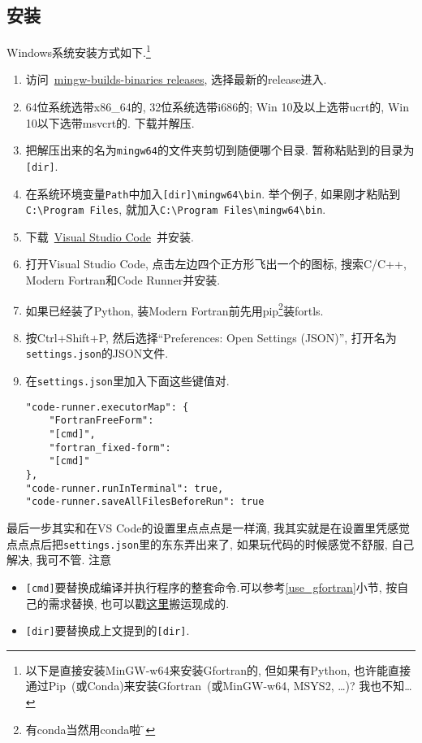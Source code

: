 \subsection{安装}

Windows系统安装方式如下.\footnote{
    以下是直接安装MinGW-w64来安装Gfortran的, 但如果有Python, 也许能直接通过Pip~(或Conda)来安装Gfortran~(或MinGW-w64, MSYS2, \dots)? 我也不知\dots
}
\begin{enumerate}
    \item 访问~\href{https://github.com/niXman/mingw-builds-binaries/releases}
    {mingw-builds-binaries releases}, 选择最新的release进入.
    \item 64位系统选带x86\_64的, 32位系统选带i686的; Win 10及以上选带ucrt的, Win 10以下选带msvcrt的. 下载并解压.
    \item 把解压出来的名为\verb|mingw64|的文件夹剪切到随便哪个目录. 暂称粘贴到的目录为\verb|[dir]|.
    \item 在系统环境变量\verb|Path|中加入\verb|[dir]\mingw64\bin|. 举个例子, 如果刚才粘贴到\verb|C:\Program Files|, 就加入\verb|C:\Program Files\mingw64\bin|.
    \item 下载~\href{https://code.visualstudio.com/sha/download?build=stable&os=win32-x64-user}
    {Visual Studio Code}~并安装.
    \item 打开Visual Studio Code, 点击左边四个正方形飞出一个的图标, 搜索C/C++, Modern Fortran和Code Runner并安装.
    \item[] 如果已经装了Python, 装Modern Fortran前先用pip\footnote{有conda当然用conda啦$\!\text{\~{}}$}装fortls.
    \item 按Ctrl+Shift+P, 然后选择``Preferences: Open Settings (JSON)'', 打开名为\verb|settings.json|的JSON文件.
    \item 在\verb|settings.json|里加入下面这些键值对.
    \begin{verbatim}
"code-runner.executorMap": {
    "FortranFreeForm":
    "[cmd]",
    "fortran_fixed-form":
    "[cmd]"
},
"code-runner.runInTerminal": true,
"code-runner.saveAllFilesBeforeRun": true
    \end{verbatim}
\end{enumerate}

最后一步其实和在VS Code的设置里点点点是一样滴, 我其实就是在设置里凭感觉点点点后把\verb|settings.json|里的东东弄出来了, 如果玩代码的时候感觉不舒服, 自己解决, 我可不管. 注意
\begin{itemize}
    \item \verb|[cmd]|要替换成编译并执行程序的整套命令.可以参考\ref{use_gfortran}小节, 按自己的需求替换, 也可以戳\href{https://zhuanlan.zhihu.com/p/362328064}{这里}搬运现成的.
    \item \verb|[dir]|要替换成上文提到的\verb|[dir]|.
\end{itemize}

